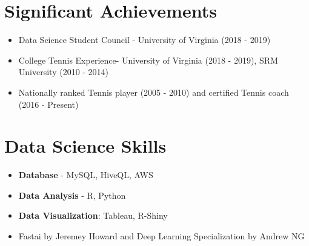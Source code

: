 \documentclass[11pt,a4paper,cambria]{moderncv}        %
\begin{document}
\section{Significant Achievements}

\begin{itemize}[leftmargin=.2in]
\setlength\itemsep{.2em}

\item Data Science Student Council - University of Virginia (2018 - 2019)
\vspace{-5pt}
\item College Tennis Experience- 
University of Virginia (2018 - 2019),
SRM University (2010 - 2014)
\vspace{-5pt}
\item Nationally ranked Tennis player (2005 - 2010) and certified Tennis coach (2016 - Present)


\end{itemize}

\section{Data Science Skills}

\begin{itemize}[leftmargin=.2in]
\setlength\itemsep{.2em}

\item \textbf{Database}  - MySQL, HiveQL, AWS
\vspace{-5pt}
\item \textbf{Data Analysis} - R, Python
\vspace{-5pt}
\item \textbf{Data Visualization}: Tableau, R-Shiny
\vspace{-5pt}
\item Fastai by Jeremey Howard and Deep Learning Specialization by Andrew NG 
\end{itemize}



\nocite{*}



\end{document}
